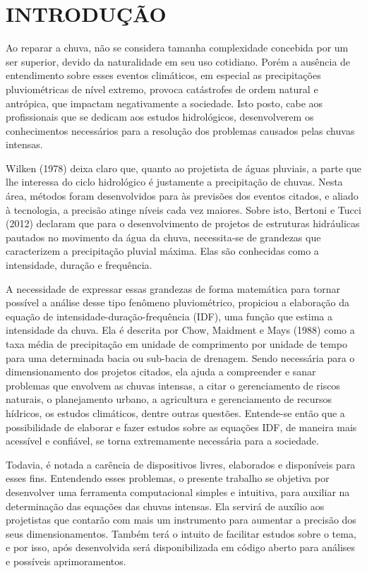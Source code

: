 \onehalfspacing
\chapter{INTRODUÇÃO}

Ao reparar a chuva, não se considera tamanha complexidade concebida por um ser superior, devido da naturalidade em seu uso cotidiano. Porém a ausência de entendimento sobre esses eventos climáticos, em especial as precipitações pluviométricas de nível extremo, provoca catástrofes de ordem natural e antrópica, que impactam negativamente a sociedade. Isto posto, cabe aos profissionais que se dedicam aos estudos hidrológicos, desenvolverem os conhecimentos necessários para a resolução dos problemas causados pelas chuvas intensas.

Wilken (1978) deixa claro que, quanto ao projetista de águas pluviais, a parte que lhe interessa do ciclo hidrológico é justamente a precipitação de chuvas. Nesta área, métodos foram desenvolvidos para às previsões dos eventos citados, e aliado à tecnologia, a precisão atinge níveis cada vez maiores. Sobre isto, Bertoni e Tucci (2012) declaram que para o desenvolvimento de projetos de estruturas hidráulicas pautados no movimento da água da chuva, necessita-se de grandezas que caracterizem a precipitação pluvial máxima. Elas são conhecidas como a intensidade, duração e frequência.

A necessidade de expressar essas grandezas de forma matemática para tornar possível a análise desse tipo fenômeno pluviométrico, propiciou a elaboração da equação de intensidade-duração-frequência (IDF), uma função que estima a intensidade da chuva. Ela é descrita por Chow, Maidment e Mays (1988) como a taxa média de precipitação em unidade de comprimento por unidade de tempo para uma determinada bacia ou sub-bacia de drenagem. Sendo necessária para o dimensionamento dos projetos citados, ela ajuda a compreender e sanar problemas que envolvem as chuvas intensas, a citar o gerenciamento de riscos naturais, o planejamento urbano, a agricultura e gerenciamento de recursos hídricos, os estudos climáticos, dentre outras questões. Entende-se então que a possibilidade de elaborar e fazer estudos sobre as equações IDF, de maneira mais acessível e confiável, se torna extremamente necessária para a sociedade. 

Todavia, é notada a carência de dispositivos livres, elaborados e disponíveis para esses fins. Entendendo esses problemas, o presente trabalho se objetiva por desenvolver uma ferramenta computacional simples e intuitiva, para auxiliar na determinação das equações das chuvas intensas. Ela servirá de auxílio aos projetistas que contarão com mais um instrumento para aumentar a precisão dos seus dimensionamentos. Também terá o intuito de facilitar estudos sobre o tema, e por isso, após desenvolvida será disponibilizada em código aberto para análises e possíveis aprimoramentos.
